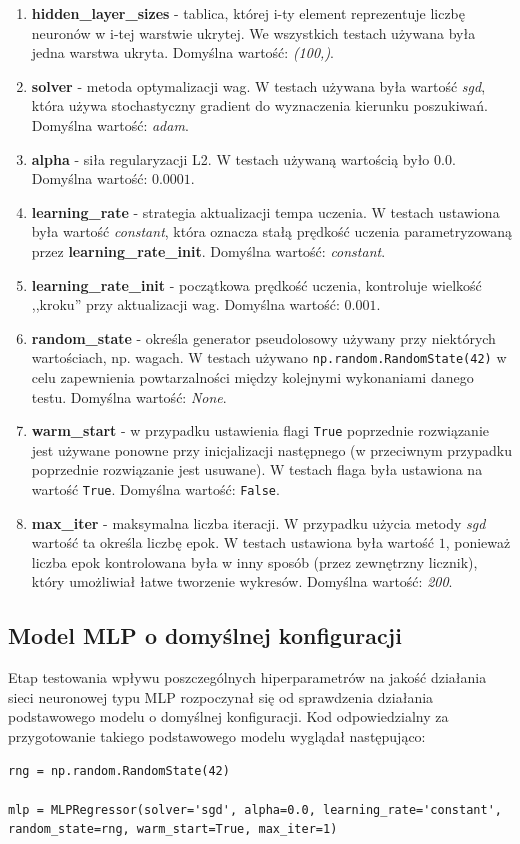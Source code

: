 \documentclass{article}
\newcommand{\code}[1]{\colorbox{light-gray}{\texttt{#1}}}
\begin{document}
    \begin{enumerate}
        \item \textbf{hidden\_layer\_sizes} - tablica, której i-ty element reprezentuje liczbę neuronów w i-tej warstwie ukrytej. We wszystkich testach używana była jedna warstwa ukryta. Domyślna wartość: \textit{(100,)}.
        \item \textbf{solver} - metoda optymalizacji wag. W testach używana była wartość \textit{sgd}, która używa stochastyczny gradient do wyznaczenia kierunku poszukiwań. Domyślna wartość: \textit{adam}.
        \item \textbf{alpha} - siła regularyzacji L2. W testach używaną wartością było $0.0$. Domyślna wartość: $0.0001$.
        \item \textbf{learning\_rate} - strategia aktualizacji tempa uczenia. W testach ustawiona była wartość \textit{constant}, która oznacza stałą prędkość uczenia parametryzowaną przez \textbf{learning\_rate\_init}. Domyślna wartość: \textit{constant}.
        \item \textbf{learning\_rate\_init} - początkowa prędkość uczenia, kontroluje wielkość ,,kroku'' przy aktualizacji wag. Domyślna wartość: $0.001$.
        \item \textbf{random\_state} - określa generator pseudolosowy używany przy niektórych wartościach, np. wagach. W testach używano \code{np.random.RandomState(42)} w celu zapewnienia powtarzalności między kolejnymi wykonaniami danego testu. Domyślna wartość: \textit{None}.
        \item \textbf{warm\_start} - w przypadku ustawienia flagi \code{True} poprzednie rozwiązanie jest używane ponowne przy inicjalizacji następnego (w przeciwnym przypadku poprzednie rozwiązanie jest usuwane). W testach flaga była ustawiona na wartość \code{True}. Domyślna wartość: \code{False}.
        \item \textbf{max\_iter} - maksymalna liczba iteracji. W przypadku użycia metody \textit{sgd} wartość ta określa liczbę epok. W testach ustawiona była wartość $1$, ponieważ liczba epok kontrolowana była w inny sposób (przez zewnętrzny licznik), który umożliwiał łatwe tworzenie wykresów. Domyślna wartość: \textit{200}.
    \end{enumerate}
    
    \subsection{Model MLP o domyślnej konfiguracji}
        Etap testowania wpływu poszczególnych hiperparametrów na jakość działania sieci neuronowej typu MLP rozpoczynał się od sprawdzenia działania podstawowego modelu o domyślnej konfiguracji. Kod odpowiedzialny za przygotowanie takiego podstawowego modelu wyglądał następująco:
\begin{lstlisting}
rng = np.random.RandomState(42)

mlp = MLPRegressor(solver='sgd', alpha=0.0, learning_rate='constant', random_state=rng, warm_start=True, max_iter=1)
\end{lstlisting}
\end{document}
